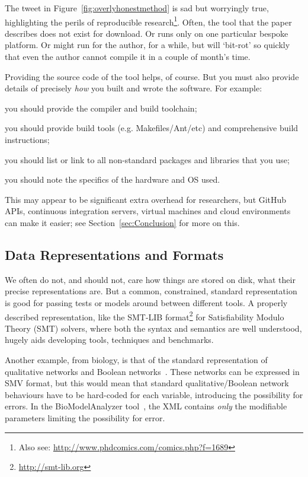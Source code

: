 \documentclass[10pt,conference,final]{IEEEtran}
\begin{document}
The tweet in Figure~\ref{fig:overlyhonestmethod} is sad but worryingly
true, highlighting the perils of reproducible research\footnote{Also
see: \url{http://www.phdcomics.com/comics.php?f=1689}}. Often, the
tool that the paper describes does not exist for download. Or runs
only on one particular bespoke platform. Or might run for the author,
for a while, but will `bit-rot' so quickly that even the author cannot
compile it in a couple of month's time.

 Providing the
source code of the tool helps, of course. But you must also provide
details of precisely \emph{how} you built and wrote the software. For
example:

\begin{compactitem}
\item you should provide the compiler and build toolchain; 
\item you should provide build tools (e.g. Makefiles/Ant/etc) and
  comprehensive build instructions; 
\item you should list or link to all non-standard packages and libraries that you use; 
\item you should note the specifics of the hardware and OS used. 
\end{compactitem}

This may appear to be significant extra overhead for researchers, but
GitHub APIs, continuous integration servers, virtual machines and
cloud environments can make it easier; see
Section~\ref{sec:Conclusion} for more on this.

\subsection{Data Representations and Formats}

We often do not, and should not, care how things are stored on disk,
what their precise representations are. But a common, constrained,
standard representation is good for passing tests or models around
between different tools. A properly described representation, like the
SMT-LIB format\footnote{\url{http://smt-lib.org}} for Satisfiability
Modulo Theory (SMT) solvers, where both the syntax and semantics are
well understood, hugely aids developing tools, techniques and
benchmarks.

Another example, from biology, is that of the standard representation
of qualitative networks and Boolean
networks~\cite{Kauffman1969,Schaub2007}.  These networks can be
expressed in SMV format, but this would mean that standard
qualitative/Boolean network behaviours have to be hard-coded for each
variable, introducing the possibility for errors. In the
BioModelAnalyzer tool~\cite{Benque2012}, the XML contains \emph{only}
the modifiable parameters limiting the possibility for error.
\end{document}
